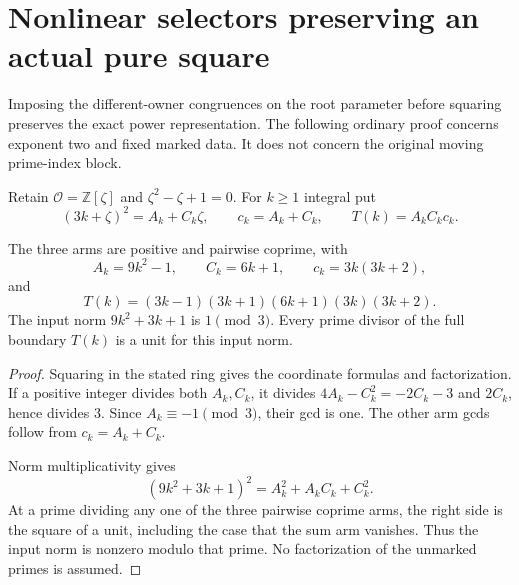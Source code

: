 \section{Nonlinear selectors preserving an actual pure square}
\label{np19-section}

Imposing the different-owner congruences on the root parameter before
squaring preserves the exact power representation. The following
ordinary proof concerns exponent two and fixed marked data. It does
not concern the original moving prime-index block.

Retain \(\mathcal O=\mathbb Z[\zeta]\) and
\(\zeta^2-\zeta+1=0\). For \(k\ge1\) integral put
\[
 (3k+\zeta)^2=A_k+C_k\zeta,\qquad c_k=A_k+C_k,\qquad
 T(k)=A_kC_kc_k.
\]

\begin{proposition}
\label{np19-actual}
The three arms are positive and pairwise coprime, with
\[
 A_k=9k^2-1,\qquad C_k=6k+1,\qquad c_k=3k(3k+2),
\]
and
\begin{equation}
 T(k)=(3k-1)(3k+1)(6k+1)(3k)(3k+2).
 \label{np19-boundary}
\end{equation}
The input norm \(9k^2+3k+1\) is \(1\pmod3\). Every prime divisor
of the full boundary \(T(k)\) is a unit for this input norm.
\end{proposition}
\begin{proof}
Squaring in the stated ring gives the coordinate formulas and
factorization. If a positive integer divides both \(A_k,C_k\),
it divides \(4A_k-C_k^2=-2C_k-3\) and \(2C_k\), hence divides
\(3\). Since \(A_k\equiv-1\pmod3\), their gcd is one.
The other arm gcds follow from \(c_k=A_k+C_k\).

Norm multiplicativity gives
\[
 (9k^2+3k+1)^2=A_k^2+A_kC_k+C_k^2.
\]
At a prime dividing any one of the three pairwise coprime arms,
the right side is the square of a unit, including the case that
the sum arm vanishes. Thus the input norm is nonzero modulo that
prime. No factorization of the unmarked primes is assumed.
\end{proof}

